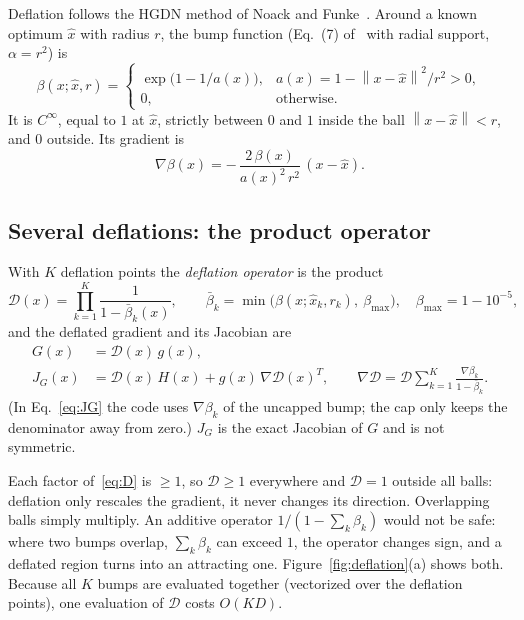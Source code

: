\documentclass[11pt]{article}
\newcommand{\norm}[1]{\left\lVert #1 \right\rVert}
\newcommand{\xh}{\hat{x}}
\begin{document}
Deflation follows the HGDN method of Noack and Funke~\cite{noack2017}. Around a known optimum
$\xh$ with radius $r$, the bump function (Eq.~(7) of~\cite{noack2017} with radial support,
$\alpha = r^2$) is
\begin{equation}\label{eq:bump}
  \beta(x; \xh, r) =
  \begin{cases}
    \exp\!\big(1 - 1/a(x)\big), & a(x) = 1 - \norm{x-\xh}^2/r^2 > 0,\\[2pt]
    0, & \text{otherwise.}
  \end{cases}
\end{equation}
It is $C^\infty$, equal to $1$ at $\xh$, strictly between $0$ and $1$ inside the ball
$\norm{x - \xh} < r$, and $0$ outside. Its gradient is
\begin{equation}\label{eq:bumpgrad}
  \nabla\beta(x) = -\,\frac{2\,\beta(x)}{a(x)^2\, r^2}\,(x - \xh).
\end{equation}

\subsection{Several deflations: the product operator}

With $K$ deflation points the \emph{deflation operator} is the product
\begin{equation}\label{eq:D}
  \mathcal{D}(x) = \prod_{k=1}^{K} \frac{1}{1 - \bar\beta_k(x)},
  \qquad \bar\beta_k = \min\big(\beta(x;\xh_k,r_k),\ \beta_{\max}\big),
  \quad \beta_{\max} = 1 - 10^{-5},
\end{equation}
and the deflated gradient and its Jacobian are
\begin{align}
  G(x) &= \mathcal{D}(x)\, g(x), \label{eq:G}\\
  J_G(x) &= \mathcal{D}(x)\, H(x) + g(x)\, \nabla\mathcal{D}(x)^T,
  \qquad
  \nabla\mathcal{D} = \mathcal{D} \sum_{k=1}^K \frac{\nabla\beta_k}{1 - \bar\beta_k}. \label{eq:JG}
\end{align}
(In Eq.~\eqref{eq:JG} the code uses $\nabla\beta_k$ of the uncapped bump; the cap only keeps
the denominator away from zero.) $J_G$ is the exact Jacobian of $G$ and is not symmetric.

Each factor of~\eqref{eq:D} is $\ge 1$, so $\mathcal{D} \ge 1$ everywhere and $\mathcal{D} = 1$
outside all balls: deflation only rescales the gradient, it never changes its direction.
Overlapping balls simply multiply. An additive operator $1/(1 - \sum_k \beta_k)$ would not be
safe: where two bumps overlap, $\sum_k \beta_k$ can exceed $1$, the operator changes sign, and a
deflated region turns into an attracting one. Figure~\ref{fig:deflation}(a) shows both.
Because all $K$ bumps are evaluated together (vectorized over the deflation points), one
evaluation of $\mathcal{D}$ costs $O(KD)$.
\end{document}
